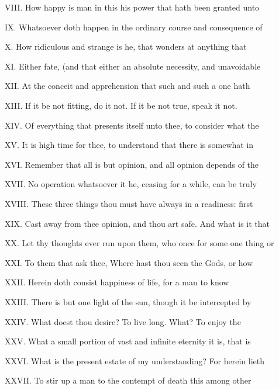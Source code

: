 VIII. How happy is man in this his power that
hath been granted unto

IX. Whatsoever doth happen in the ordinary
course and consequence of

X. How ridiculous and strange is he, that
wonders at anything that

XI. Either fate, (and that either an absolute
necessity, and unavoidable

XII. At the conceit and apprehension that such
and such a one hath

XIII. If it be not fitting, do it not. If it
be not true, speak it not.

XIV. Of everything that presents itself unto
thee, to consider what the

XV. It is high time for thee, to understand
that there is somewhat in

XVI. Remember that all is but opinion, and all
opinion depends of the

XVII. No operation whatsoever it he, ceasing
for a while, can be truly

XVIII. These three things thou must have
always in a readiness: first

XIX. Cast away from thee opinion, and thou art
safe. And what is it that

XX. Let thy thoughts ever run upon them, who
once for some one thing or

XXI. To them that ask thee, Where hast thou
seen the Gods, or how

XXII. Herein doth consist happiness of life,
for a man to know

XXIII. There is but one light of the sun,
though it be intercepted by

XXIV. What doest thou desire? To live long.
What? To enjoy the

XXV. What a small portion of vast and infinite
eternity it is, that is

XXVI. What is the present estate of my
understanding? For herein lieth

XXVII. To stir up a man to the contempt of
death this among other
